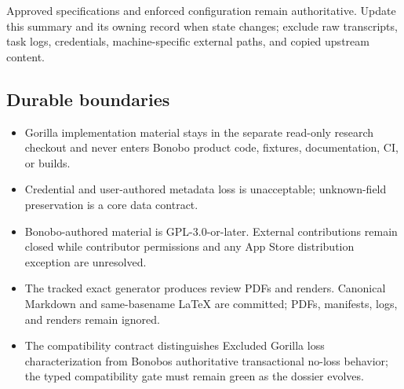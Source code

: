 \documentclass[
  letterpaper,
]{article}
\providecommand{\tightlist}{%
  \setlength{\itemsep}{0pt}\setlength{\parskip}{0pt}}
\begin{document}
Approved specifications and enforced configuration remain authoritative. Update this summary and its owning record when
state changes; exclude raw transcripts, task logs, credentials, machine-specific external paths, and copied upstream
content.

\subsection{Durable boundaries}\label{durable-boundaries}

\begin{itemize}
\tightlist
\item
  Gorilla implementation material stays in the separate read-only research checkout and never enters Bonobo product
  code, fixtures, documentation, CI, or builds.
\item
  Credential and user-authored metadata loss is unacceptable; unknown-field preservation is a core data contract.
\item
  Bonobo-authored material is GPL-3.0-or-later. External contributions remain closed while contributor permissions and
  any App Store distribution exception are unresolved.
\item
  The tracked exact generator produces review PDFs and renders. Canonical Markdown and same-basename LaTeX are
  committed; PDFs, manifests, logs, and renders remain ignored.
\item
  The compatibility contract distinguishes Excluded Gorilla loss characterization from Bonobo\textquotesingle s
  authoritative transactional no-loss behavior; the typed compatibility gate must remain green as the dossier evolves.
\end{itemize}
\end{document}
